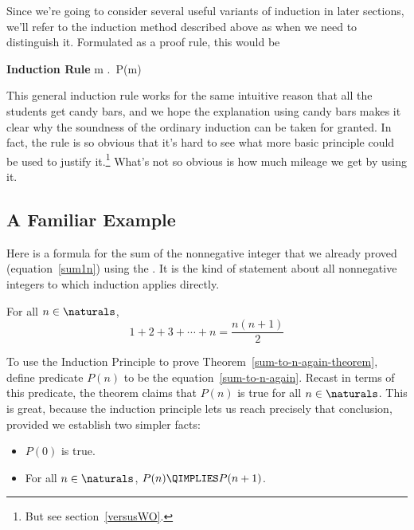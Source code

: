 Since we're going to consider several useful variants of induction in
later sections, we'll refer to the induction method described above as
 when we need to distinguish it.  Formulated as 
a proof rule, this would be
\begin{rul*} \textbf{Induction Rule}
{\forall m \in \naturals.\, P(m)}
\end{rul*}

This general induction rule works for the same intuitive reason that all
the students get candy bars, and we hope the explanation using candy bars
makes it clear why the soundness of the ordinary induction can be taken
for granted.  In fact, the rule is so obvious that it's hard to see what
more basic principle could be used to justify it.\footnote{But see
section~\ref{versusWO}.}  What's not so obvious is how much mileage 
we get by using it.

\subsection{A Familiar Example}

Here is a formula for the sum of the nonnegative integer that we
already proved (equation~\eqref{sum1n}) using the .  It is the kind of statement about all nonnegative
integers to which induction applies directly.
\begin{theorem}\label{sum-to-n-again-theorem}
For all $n \in \naturals$,
\begin{equation}\label{sum-to-n-again}
1 + 2 + 3 + \cdots + n = \frac{n(n+1)}{2}
\end{equation}
\end{theorem}

To use the Induction Principle to prove
Theorem~\ref{sum-to-n-again-theorem}, define predicate $P(n)$ to be
the equation~\eqref{sum-to-n-again}.  Recast in terms of this
predicate, the theorem claims that $P(n)$ is true for all
$n \in \naturals$.  This is great, because the induction principle
lets us reach precisely that conclusion, provided we establish two
simpler facts:
%
\begin{itemize}
\item $P(0)$ is true.
\item For all $n \in \naturals$, $P(n) \QIMPLIES P(n+1)$.
\end{itemize}

